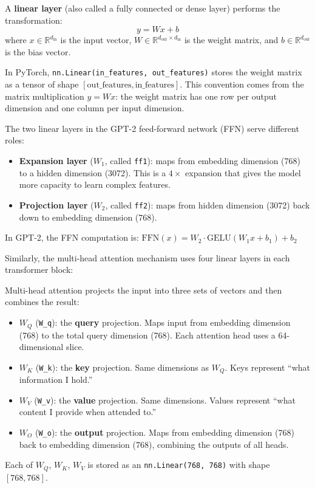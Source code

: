 A \textbf{linear layer} (also called a fully connected or dense layer)
performs the transformation:
\[
  y = Wx + b
\]
where $x \in \mathbb{R}^{d_{\text{in}}}$ is the input vector,
$W \in \mathbb{R}^{d_{\text{out}} \times d_{\text{in}}}$ is the weight
matrix, and $b \in \mathbb{R}^{d_{\text{out}}}$ is the bias vector.

In PyTorch, \texttt{nn.Linear(in\_features, out\_features)} stores the
weight matrix as a tensor of shape
$[\text{out\_features}, \text{in\_features}]$. This convention comes from
the matrix multiplication $y = Wx$: the weight matrix has one row per
output dimension and one column per input dimension.

\begin{keyconcept}
  The two linear layers in the GPT-2 feed-forward network (FFN) serve
  different roles:
  \begin{itemize}
    \item \textbf{Expansion layer} ($W_1$, called \texttt{ff1}): maps from
          embedding dimension (768) to a hidden dimension (3072). This is a
          $4\times$ expansion that gives the model more capacity to learn
          complex features.
    \item \textbf{Projection layer} ($W_2$, called \texttt{ff2}): maps from
          hidden dimension (3072) back down to embedding dimension (768).
  \end{itemize}
  In GPT-2, the FFN computation is:
  $\text{FFN}(x) = W_2 \cdot \text{GELU}(W_1 x + b_1) + b_2$
\end{keyconcept}

Similarly, the multi-head attention mechanism uses four linear layers in
each transformer block:

\begin{keyconcept}
  Multi-head attention projects the input into three sets of vectors and
  then combines the result:
  \begin{itemize}
    \item $W_Q$ (\texttt{W\_q}): the \textbf{query} projection. Maps input
          from embedding dimension (768) to the total query dimension (768).
          Each attention head uses a 64-dimensional slice.
    \item $W_K$ (\texttt{W\_k}): the \textbf{key} projection. Same
          dimensions as $W_Q$. Keys represent ``what information I hold.''
    \item $W_V$ (\texttt{W\_v}): the \textbf{value} projection. Same
          dimensions. Values represent ``what content I provide when
          attended to.''
    \item $W_O$ (\texttt{W\_o}): the \textbf{output} projection. Maps from
          embedding dimension (768) back to embedding dimension (768),
          combining the outputs of all heads.
  \end{itemize}
  Each of $W_Q$, $W_K$, $W_V$ is stored as an \texttt{nn.Linear(768, 768)}
  with shape $[768, 768]$.
\end{keyconcept}

